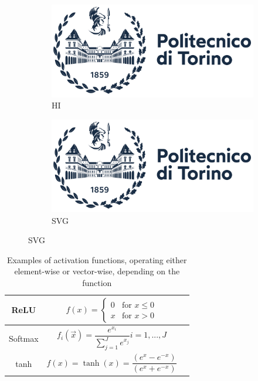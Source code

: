 \begin{figure}[h]
    \centering
    \begin{minipage}[t]{.49\linewidth}
    \begin{figure}[H]
	\centering
	\includegraphics[width=\linewidth]{images/logo/polito_logo_2021_blu.jpg}
	\caption{HI}
	\label{fig:c}
    \end{figure}
    \end{minipage}
    \hfill
    \begin{minipage}[t]{.49\linewidth}
    \begin{figure}[H]
	\centering
	\includegraphics[width=\linewidth]{images/logo/polito_logo_2021_blu.jpg}
	\caption{SVG}
	\label{fig:svg}
    \end{figure}
    \end{minipage}
\end{figure}

\begin{table}[]
    \centering
    \setcellgapes{3pt}
    \makegapedcells
    \begin{tabular}{|c|c|c}
    \hline
    ReLU & $f(x) = \begin{cases}
	0 & \text{for } x \le 0\\
	x & \text{for } x > 0\end{cases}$ \\ \hline
    Softmax & $f_i(\vec{x}) = \dfrac{e^{x_i}}{\sum_{j=1}^J e^{x_j}} i = 1, ..., J$ \\ \hline
    tanh & $f(x)=\tanh(x)=\dfrac{(e^{x} - e^{-x})}{(e^{x} + e^{-x})}$ \\ \hline
    \end{tabular}
    \caption{Examples of activation functions, operating either element-wise or vector-wise, depending on the function}
    \label{tab:activation_functions}
\end{table}

